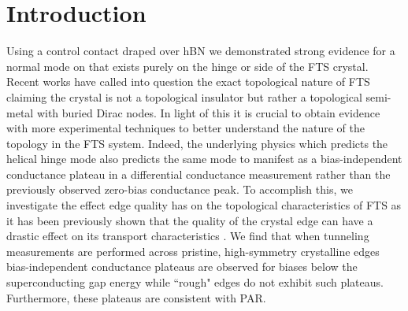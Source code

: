 \section{Introduction}
Using a control contact draped over \ac{hBN} we demonstrated strong evidence for a normal mode on that exists purely on the hinge or side of the \ac{FTS} crystal\cite{Gray2019}. Recent works have called into question the exact topological nature of \ac{FTS} claiming the crystal is not a topological insulator but rather a topological semi-metal with buried Dirac nodes. In light of this it is crucial to obtain evidence with more experimental techniques to better understand the nature of the topology in the \ac{FTS} system. Indeed, the underlying physics which predicts the helical hinge mode also predicts the same mode to manifest as a bias-independent conductance plateau in a differential conductance measurement rather than the previously observed zero-bias conductance peak. To accomplish this, we investigate the effect edge quality has on the topological characteristics of \ac{FTS} as it has been previously shown that the quality of the crystal edge can have a drastic effect on its transport characteristics . We find that when tunneling measurements are performed across pristine, high-symmetry crystalline edges bias-independent conductance plateaus are observed for biases below the superconducting gap energy while ``rough" edges do not exhibit such plateaus. Furthermore, these plateaus are consistent with \acl{PAR}.

